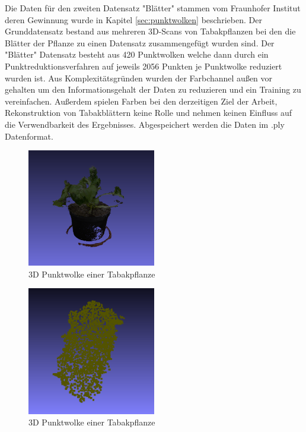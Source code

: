 \documentclass{llncs}
\begin{document}
Die Daten für den zweiten Datensatz "Blätter" stammen vom Fraunhofer Institut deren Gewinnung wurde in Kapitel \ref{sec:punktwolken} beschrieben. Der Grunddatensatz bestand aus mehreren 3D-Scans von Tabakpflanzen bei den die Blätter der Pflanze zu einen Datensatz zusammengefügt wurden sind. Der "Blätter" Datensatz besteht aus 420 Punktwolken welche dann durch ein Punktreduktionsverfahren auf jeweils 2056 Punkten je Punktwolke reduziert wurden ist. Aus Komplexitätsgründen wurden der Farbchannel außen vor gehalten um den Informationsgehalt der Daten zu reduzieren und ein Training zu vereinfachen. Außerdem spielen Farben bei den derzeitigen Ziel der Arbeit, Rekonstruktion von Tabakblättern keine Rolle und nehmen keinen Einfluss auf die Verwendbarkeit des Ergebnisses. Abgespeichert werden die Daten im .ply Datenformat.
\begin{figure}[htbp] 
	\centering
	\includegraphics[width=0.5\textwidth]{plant.png}
	\caption{3D Punktwolke einer Tabakpflanze}
	\label{fig:Bild50}
\end{figure}

\begin{figure}[htbp] 
	\centering
	\includegraphics[width=0.5\textwidth]{leaf1.png}
	\caption{3D Punktwolke einer Tabakpflanze}
	\label{fig:Bild51}
\end{figure}
\newpage
\end{document}
